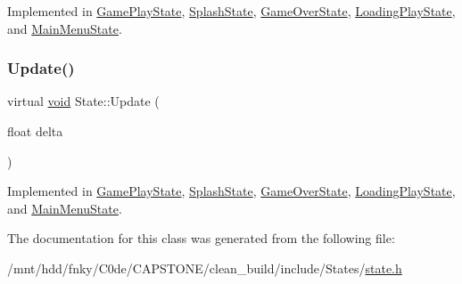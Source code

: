 Implemented in \hyperlink{classGamePlayState_a3367714db85b4d59a52bc1d8b0828d3c}{Game\+Play\+State}, \hyperlink{classSplashState_adff14b96ab0de144e0052326819e7f2e}{Splash\+State}, \hyperlink{classGameOverState_ab46f47037abd1eeabdbff49f8dfb802b}{Game\+Over\+State}, \hyperlink{classLoadingPlayState_a8676ff36334ce4de33a9874fe4a54c3f}{Loading\+Play\+State}, and \hyperlink{classMainMenuState_adde4b3b16d68c2c8b3bd03818cc30abe}{Main\+Menu\+State}.

\mbox{\label{classState_aac0d3fdee1341e168af730b8f31a7bf1}} 
\subsubsection{\texorpdfstring{Update()}{Update()}}
{\footnotesize\ttfamily virtual \hyperlink{imgui__impl__opengl3__loader_8h_ac668e7cffd9e2e9cfee428b9b2f34fa7}{void} State\+::\+Update (\begin{DoxyParamCaption}\item[{float}]{delta }\end{DoxyParamCaption})\hspace{0.3cm}{\ttfamily [pure virtual]}}



Implemented in \hyperlink{classGamePlayState_a19bcc1ff2a83a3aa001010ae35d67b85}{Game\+Play\+State}, \hyperlink{classSplashState_af19b293ae1e914e13db4382115e56d2c}{Splash\+State}, \hyperlink{classGameOverState_a4dc49d576a9435531f502660119800a9}{Game\+Over\+State}, \hyperlink{classLoadingPlayState_adab55fbf70ddda174590a55d59ec355b}{Loading\+Play\+State}, and \hyperlink{classMainMenuState_a1605be0d2e5228643d911c7069db3196}{Main\+Menu\+State}.



The documentation for this class was generated from the following file\+:\begin{DoxyCompactItemize}
\item 
/mnt/hdd/fnky/\+C0de/\+C\+A\+P\+S\+T\+O\+N\+E/clean\+\_\+build/include/\+States/\hyperlink{state_8h}{state.\+h}\end{DoxyCompactItemize}

